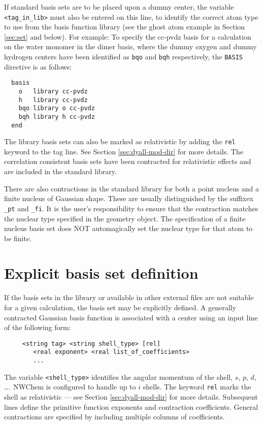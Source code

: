 If standard basis sets are to be placed upon a dummy center, the
variable \verb+<tag_in_lib>+ must also be entered on this line, to
identify the correct atom type to use from the basis function library
(see the ghost atom example in Section \ref{sec:set} and below).  For
example: To specify the cc-pvdz basis for a calculation on the water
monomer in the dimer basis, where the dummy oxygen and dummy hydrogen
centers have been identified as \verb+bqo+ and \verb+bqh+
respectively, the \verb+BASIS+ directive is as follows:

\begin{verbatim}
  basis
    o   library cc-pvdz
    h   library cc-pvdz
    bqo library o cc-pvdz
    bqh library h cc-pvdz
  end
\end{verbatim}

The library basis sets can also be marked as relativistic by adding the
\verb+rel+ keyword to the tag line. See Section \ref{sec:dyall-mod-dir} for
more details. The correlation consistent basis sets have been contracted for
relativistic effects and are included in the standard library.

There are also contractions in the standard library for both a point nucleus
and a finite nucleus of Gaussian shape. These are usually distinguished by
the suffixex {\tt \_pt} and {\tt \_fi}. It is the user's responsibility to
ensure that the contraction matches the nuclear type specified in the
geometry object. The specification of a finite nucleus basis set does NOT
automagically set the nuclear type for that atom to be finite.

\section{Explicit basis set definition}

If the basis sets in the library or available in other external files
are not suitable for a given calculation, 
the basis set may be explicitly defined.
A generally contracted Gaussian basis function is associated with a
center using an input line of the following form:
\begin{verbatim}
     <string tag> <string shell_type> [rel]
        <real exponent> <real list_of_coefficients>
        ...
\end{verbatim}

The variable \verb+<shell_type>+ identifies the angular momentum of the
shell, $s$, $p$, $d$, \ldots.  NWChem is configured to handle up to $i$
shells.  The keyword \verb+rel+ marks the shell as relativistic --- see
Section \ref{sec:dyall-mod-dir} for more details.  Subsequent lines define
the primitive function exponents and contraction coefficients.  General
contractions are specified by including multiple columns of coefficients.

